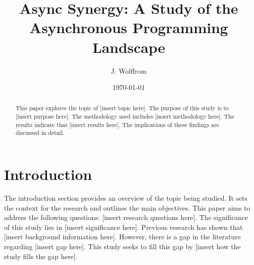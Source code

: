 \documentclass{article}
\title{Async Synergy: A Study of the Asynchronous Programming Landscape}
\author{J. Wolffrom}
\date{\today}
\begin{document}
\maketitle

\begin{abstract}
This paper explores the topic of [insert topic here]. The purpose of this study is to [insert purpose here]. The methodology used includes [insert methodology here]. The results indicate that [insert results here]. The implications of these findings are discussed in detail.
\end{abstract}

\tableofcontents

\newpage
\section{Introduction}

The introduction section provides an overview of the topic being studied. It sets the context for the research and outlines the main objectives. This paper aims to address the following questions: [insert research questions here]. The significance of this study lies in [insert significance here]. Previous research has shown that [insert background information here]. However, there is a gap in the literature regarding [insert gap here]. This study seeks to fill this gap by [insert how the study fills the gap here].
\end{document}
